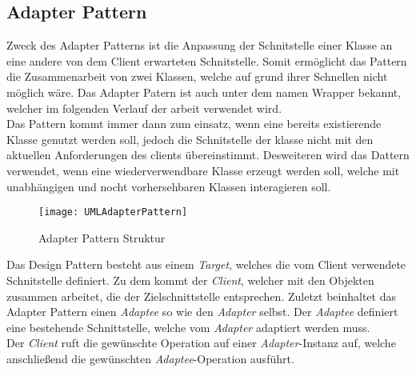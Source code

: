 \subsection{Adapter Pattern}
Zweck des Adapter Patterns ist die Anpassung der Schnitstelle einer Klasse an eine andere von dem Client erwarteten Schnitstelle. Somit ermöglicht das Pattern die Zusammenarbeit von zwei Klassen, welche auf grund ihrer Schnellen nicht möglich wäre. Das Adapter Patern ist auch unter dem namen Wrapper bekannt, welcher im folgenden Verlauf der arbeit verwendet wird.\\
Das Pattern kommt immer dann zum einsatz, wenn eine bereits existierende Klasse genutzt werden soll, jedoch die Schnitstelle der klasse nicht mit den aktuellen Anforderungen des clients übereinstimmt. Desweiteren wird das Dattern verwendet, wenn eine wiederverwendbare Klasse erzeugt werden soll, welche mit unabhängigen und nocht vorhersehbaren Klassen interagieren soll.\\      
\begin{center}
    \begin{figure}[h]
     \centering
     \texttt{[image: UMLAdapterPattern]}
     \caption{Adapter Pattern Struktur \cite{DesignPatterns}}
    \label{fig:AdapterPattern}
    \end{figure}
\end{center}
\vspace{-2cm}
Das Design Pattern besteht aus einem \textit{Target}, welches die vom Client verwendete Schnitstelle definiert. Zu dem kommt der \textit{Client}, welcher mit den Objekten zusammen arbeitet, die der Zielschnittstelle entsprechen. Zuletzt beinhaltet das Adapter Pattern einen \textit{Adaptee} so wie den \textit{Adapter} selbst. Der \textit{Adaptee} definiert eine bestehende Schnittstelle, welche vom \textit{Adapter} adaptiert werden muss.\\ 
Der \textit{Client} ruft die gewünschte Operation auf einer \textit{Adapter}-Instanz auf, welche anschließend die gewünschten \textit{Adaptee}-Operation ausführt.

